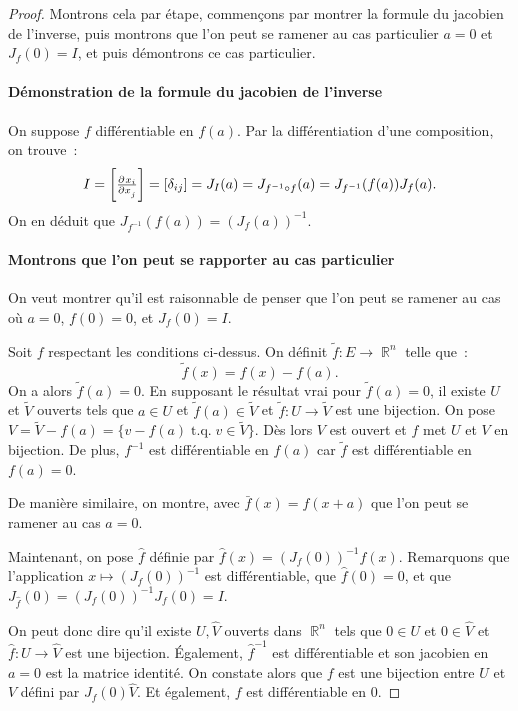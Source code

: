 \documentclass{article}
\DeclareMathOperator{\R}{\mathbb R}
\DeclareMathOperator{\tq}{ t.q. }
\theoremstyle{definition}
\theoremstyle{remark}
\begin{document}
		\begin{proof} Montrons cela par étape, commençons par montrer la formule du jacobien de l'inverse, puis montrons que l'on peut se ramener au cas
		particulier $a=0$ et $J_f(0) = I$, et puis démontrons ce cas particulier.

		\paragraph{Démonstration de la formule du jacobien de l'inverse} On suppose $f$ différentiable en $f(a)$. Par la différentiation d'une composition, on
		trouve~:
		\[I = \left[\pd {x_i}{x_j}\right] = [\delta_{ij}] = J_I(a) = J_{f^{-1} \circ f}(a) = J_{f^{-1}}(f(a))J_f(a).\]
		On en déduit que $J_{f^{-1}}(f(a)) = (J_f(a))^{-1}$.

		\paragraph{Montrons que l'on peut se rapporter au cas particulier} On veut montrer qu'il est raisonnable de penser que l'on peut se ramener au cas où
		$a=0$, $f(0) = 0$, et $J_f(0) = I$.

		Soit $f$ respectant les conditions ci-dessus. On définit $\tilde f : E \to \R^n$ telle que~:
		\[\tilde f(x) = f(x)-f(a).\]
		On a alors $\tilde f(a) = 0$. En supposant le résultat vrai pour $\tilde f(a) = 0$,  il existe $U$ et $\tilde V$ ouverts tels que $a \in U$ et
		$\tilde f(a) \in \tilde V$ et $\tilde f : U \to \tilde V$ est une bijection. On pose $V = \tilde V - f(a) = \{v - f(a) \tq v \in \tilde V\}$.
		Dès lors $V$ est ouvert et $f$ met $U$ et $V$ en bijection. De plus, $f^{-1}$ est différentiable en $f(a)$ car $\tilde f$ est différentiable en $f(a)=0$.

		De manière similaire, on montre, avec $\bar f(x) = f(x+a)$ que l'on peut se ramener au cas $a=0$.

		Maintenant, on pose $\hat f$ définie par $\hat f(x) = (J_f(0))^{-1}f(x)$. Remarquons que l'application $x \mapsto (J_f(0))^{-1}$ est différentiable, que
		$\hat f(0) = 0$, et que $J_{\hat f}(0) = (J_f(0))^{-1}J_f(0) = I$.

		On peut donc dire qu'il existe $U, \hat V$ ouverts dans $\R^n$ tels que $0 \in U$ et $0 \in \hat V$ et $\hat f : U \to \hat V$ est une bijection.
		Également, $\hat f^{-1}$ est différentiable et son jacobien en $a=0$ est la matrice identité. On constate alors que $f$ est une bijection entre $U$ et
		$V$ défini par $J_f(0)\hat V$. Et également, $f$ est différentiable en $0$.


\end{proof}
\end{document}
